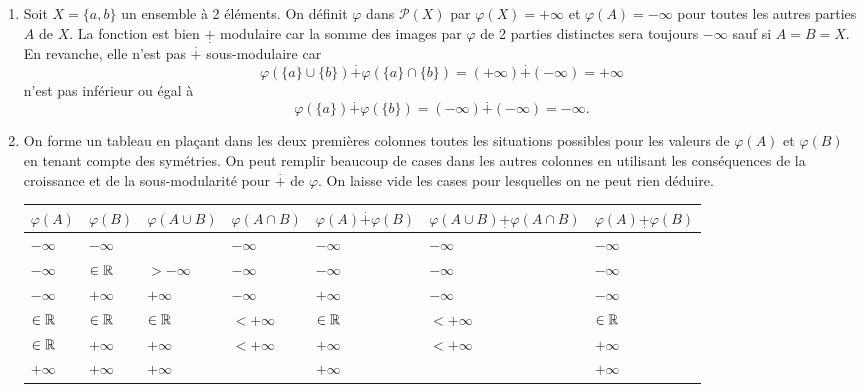   \begin{demo}
  \begin{enumerate}
    \item Soit $X=\{a,b\}$ un ensemble à 2 éléments. On définit $\varphi$ dans $\mathcal{P}(X)$ par $\varphi(X) = +\infty$ et $\varphi(A) = - \infty$ pour toutes les autres parties $A$ de $X$. La fonction est bien $\underset{.}{+}$ modulaire car la somme des images par $\varphi$ de 2 parties distinctes sera toujours $-\infty$ sauf si $A=B=X$. En revanche, elle n'est pas $\overset{.}{+}$ sous-modulaire car
    \begin{displaymath}
      \varphi(\{a\}\cup \{b\}) \overset{.}{+} \varphi(\{a\}\cap \{b\}) = (+\infty) \overset{.}{+} (-\infty) = + \infty
    \end{displaymath}
    n'est pas inférieur ou égal à
    \begin{displaymath}
      \varphi(\{a\}) \overset{.}{+} \varphi(\{b\}) = (-\infty) \overset{.}{+} (-\infty) = - \infty.
    \end{displaymath}

    \item On forme un tableau en plaçant dans les deux premières colonnes toutes les situations possibles pour les valeurs de $\varphi(A)$ et $\varphi(B)$ en tenant compte des symétries. On peut remplir beaucoup de cases dans  les autres colonnes en utilisant les conséquences de la croissance et de la sous-modularité pour $\overset{.}{+}$ de $\varphi$. On laisse vide les cases pour lesquelles on ne peut rien déduire.
\begin{center}
\begin{tabular}{lllllll}
$\varphi(A)$ & $\varphi(B)$ & $\varphi(A\cup B)$ & $\varphi(A\cap B)$ & $\varphi(A) \overset{.}{+} \varphi(B)$ & $\varphi(A\cup B) \underset{.}{+} \varphi(A\cap B)$ & $\varphi(A) \underset{.}{+} \varphi(B)$\\ \hline
$-\infty$    & $-\infty$    &                    & $-\infty$          & $-\infty$                              & $-\infty$   & $-\infty$ \\  \hline
$-\infty$    & $\in \mathbb{R}$     & $> -\infty$        & $-\infty$          & $-\infty$                              & $-\infty$   & $-\infty$ \\ \hline
$-\infty$    & $+\infty$    & $+\infty$          & $-\infty$          & $+\infty$                              & $-\infty$   & $-\infty$\\ \hline
$\in \mathbb{R}$     & $\in \mathbb{R}$     & $\in \mathbb{R}$           & $< +\infty$        & $\in \mathbb{R}$                               & $< +\infty$ & $\in \mathbb{R}$\\ \hline
$\in \mathbb{R}$     & $+\infty$    & $+\infty$          & $< +\infty$        & $+\infty$                              & $< +\infty$ & $+\infty$ \\ \hline
$+\infty$    & $+\infty$    & $+\infty$          &                    & $+\infty$                              &             & $+\infty$\\ \hline
\end{tabular}
\end{center}
  \end{enumerate}
  \end{demo}
